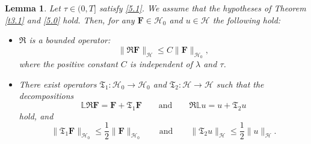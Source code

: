 \documentclass[reqno]{amsart}
\newtheorem{lemma}[proposition]{Lemma}
\theoremstyle{definition}
\numberwithin{equation}{section}
\begin{document}
\begin{lemma}\label{l5.2}
Let $\tau\in(0,T]$ satisfy \eqref{5.1}. We assume that
 the hypotheses of Theorem \ref{t3.1} and \eqref{5.0} hold.
Then,
for any $\mathbf{F}\in\mathcal{H}_{0}$ and $u\in\mathcal{H}$ the following hold:
 \begin{itemize}
    \item[{\bf (i)}] $\mathfrak{R}$ is a bounded operator:
    \begin{equation}\label{3.31}
\|\mathfrak{R}\mathbf{F}\|_{\mathcal{H}}\leq
C\|\mathbf{F}\|_{\mathcal{H}_{0}},
    \end{equation}
    where the positive constant $C$ is independent of $\lambda$
    and $\tau$.
    \smallskip
    \item[{\bf (ii)}] There exist operators  $\mathfrak{T}_{1}:\mathcal{H}_0\to \mathcal{H}_0$ and 
    $\mathfrak{T}_{2}:\mathcal{H}\to \mathcal{H}$ such that
    the decompositions
    \begin{equation*}
\mathbb{L}\mathfrak{R}\mathbf{F}=\mathbf{F}+\mathfrak{T}_{1}\mathbf{F}\qquad\text{and}\qquad
\mathfrak{R}\mathbb{L}u=u+\mathfrak{T}_{2}u
 \end{equation*}
 hold, and
    \begin{equation*}
		\|\mathfrak{T}_{1}\mathbf{F}\|_{\mathcal{H}_0}\leq\frac{1}{2}\|\mathbf{F}\|_{\mathcal{H}_{0}}
\qquad\text{and}\qquad
\|\mathfrak{T}_{2}u\|_{\mathcal{H}}
\leq\frac{1}{2}\|u\|_{\mathcal{H}}.
 \end{equation*}
 \end{itemize}
\end{lemma}
\end{document}
